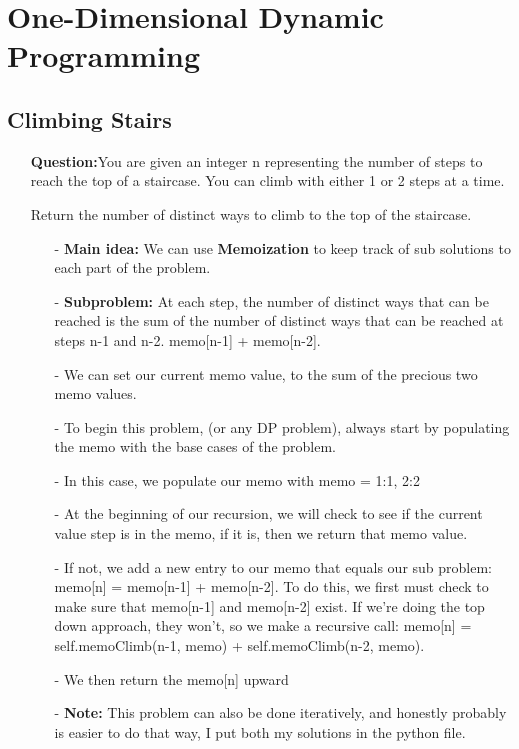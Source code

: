 \documentclass[12pt]{article}
\begin{document}
\section{One-Dimensional Dynamic Programming}

\subsection{Climbing Stairs}
\begin{enumerate}
  \item[] \textbf{Question:}You are given an integer n representing the number of steps to reach the top of a staircase. You can climb with either 1 or 2 steps at a time.

Return the number of distinct ways to climb to the top of the staircase.

    \begin{enumerate}
      \item[-] \textbf{Main idea:} We can use \textbf{Memoization} to keep track of sub solutions to each part of the problem. 
      \item[-] \textbf{Subproblem:} At each step, the number of distinct ways that can be reached is the sum of the number of distinct ways that can be reached at steps n-1 and n-2. memo[n-1] + memo[n-2].
      \item[-] We can set our current memo value, to the sum of the precious two memo values. 
      \item[-] To begin this problem, (or any DP problem), always start by populating the memo with the base cases of the problem.
      \item[-] In this case, we populate our memo with   memo = {1:1, 2:2} 
      \item[-] At the beginning of our recursion, we will check to see if the current value step is in the memo, if it is, then we return that memo value. 
      \item[-] If not, we add a new entry to our memo that equals our sub problem: memo[n] = memo[n-1] + memo[n-2]. To do this, we first must check to make sure that memo[n-1] and memo[n-2] exist. If we're doing the top down approach, they won't, so we make a recursive call:  memo[n] = self.memoClimb(n-1, memo) + self.memoClimb(n-2, memo). 
      \item[-] We then return the memo[n] upward 
      \item[-] \textbf{Note:} This problem can also be done iteratively, and honestly probably is easier to do that way, I put both my solutions in the python file.
    \end{enumerate}
\end{enumerate}
\end{document}
